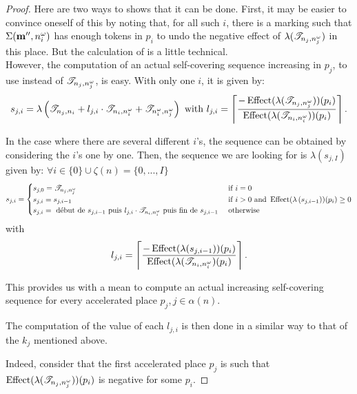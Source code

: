 \begin{proof}
  Here are two ways to shows that it can be done.
  First, it may be easier to convince oneself of this by noting that, for all such $i$, there is a marking \marpp such that $\Sigma(\mathbf{m''}, n^\omega_i)$ has enough tokens in $p_i$ to undo the negative effect of $\lambda(\mathscr{T}_{n_j,n^\omega_j})$ in this place. But the calculation of \marpp is a little technical.\\
   However, the computation of an actual self-covering sequence increasing in $p_j$, to use instead of $\mathscr{T}_{n_j, n^\omega_j}$, is easy. With only one $i$, it is given by:
   \[
     s_{j,i} = \lambda\left(\mathscr{T}_{n_j,n_i} + l_{j,i} \cdot \mathscr{T}_{n_i,n^\omega_i} + \mathscr{T}_{n^\omega_i,n^\omega_j}\right)
    \text{ with } l_{j,i} =
    \left\lceil \frac{-\operatorname{Effect}(\lambda(\mathscr{T}_{n_j,n^\omega_j}))(p_i)}
                     { \operatorname{Effect}(\lambda(\mathscr{T}_{n_i,n^\omega_i}))(p_i)} \right\rceil \text{.}\]

  In the case where there are several different $i$'s, the sequence can be obtained by considering the $i$'s one by one. Then, the sequence we are looking for is $\lambda\left(s_{j,I}\right)$ given by: $\forall i \in \{0\} \cup \zeta(n) = \{0, ..., I\}$
  \[
    s_{j,i} =
    \begin{cases}
      s_{j,0} = \mathscr{T}_{n_j,n^\omega_j}
        &\text{ if } i = 0 \\
      s_{j,i} = s_{j,i-1}
        &\text{ if } i > 0 \text{ and } \operatorname{Effect}(\lambda\left(s_{j,i-1}\right))(p_i) \geq 0 \\
      s_{j,i} = \text{ début de } s_{j,i-1} \text{ puis } l_{j,i} \cdot \mathscr{T}_{n_i,n^\omega_i} \text{ puis fin de } s_{j,i-1}
        &\text{ otherwise}
    \end{cases}
  \]
  with
  \[
    l_{j,i} = 
    \left\lceil \frac{-\operatorname{Effect}(\lambda(s_{j,i-1}))(p_i)}
                     { \operatorname{Effect}(\lambda(\mathscr{T}_{n_i,n^\omega_i})(p_i)} \right\rceil \text{.}
  \]

  This provides us with a mean to compute an actual increasing self-covering sequence for every accelerated place $p_j, j \in \alpha(n)$.

  The computation of the value of each $l_{j,i}$ is then done in a similar way to that of the $k_j$ mentioned above.

  Indeed, consider that the first accelerated place $p_j$ is such that $\operatorname{Effect}(\lambda(\mathscr{T}_{n_j,n^\omega_j}))(p_i)$ is negative for some $p_i$.




\end{proof}

